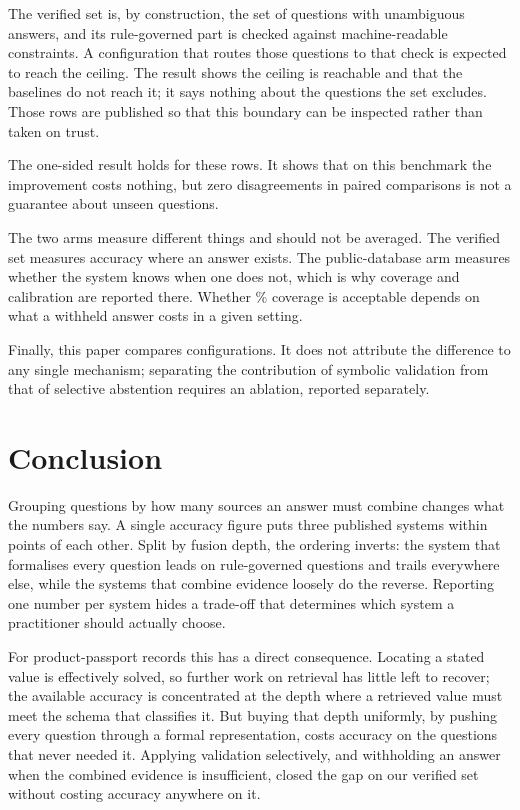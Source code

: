 \documentclass[conference]{IEEEtran}
\begin{document}
The verified set is, by construction, the set of questions with unambiguous
answers, and its rule-governed part is checked against machine-readable
constraints. A configuration that routes those questions to that check is
expected to reach the ceiling. The result shows the ceiling is reachable and
that the baselines do not reach it; it says nothing about the questions the set
excludes. Those \ExcludedRows{} rows are published so that this boundary can be
inspected rather than taken on trust.

The one-sided result holds for these rows. It shows that on this benchmark the
improvement costs nothing, but zero disagreements in \VerifiedN{} paired
comparisons is not a guarantee about unseen questions.

The two arms measure different things and should not be averaged. The verified
set measures accuracy where an answer exists. The public-database arm measures
whether the system knows when one does not, which is why coverage and
calibration are reported there. Whether \OffCoverage\% coverage is acceptable
depends on what a withheld answer costs in a given setting.

Finally, this paper compares configurations. It does not attribute the
difference to any single mechanism; separating the contribution of symbolic
validation from that of selective abstention requires an ablation, reported
separately.

\section{Conclusion}
Grouping questions by how many sources an answer must combine changes what the
numbers say. A single accuracy figure puts three published systems within
\SpreadOverall{} points of each other. Split by fusion depth, the ordering
inverts: the system that formalises every question leads on rule-governed
questions and trails everywhere else, while the systems that combine evidence
loosely do the reverse. Reporting one number per system hides a trade-off that
determines which system a practitioner should actually choose.

For product-passport records this has a direct consequence. Locating a stated
value is effectively solved, so further work on retrieval has little left to
recover; the available accuracy is concentrated at the depth where a retrieved
value must meet the schema that classifies it. But buying that depth uniformly, by pushing
every question through a formal representation, costs accuracy on the questions
that never needed it. Applying validation selectively, and withholding an answer
when the combined evidence is insufficient, closed the gap on our verified set
without costing accuracy anywhere on it.
\end{document}
